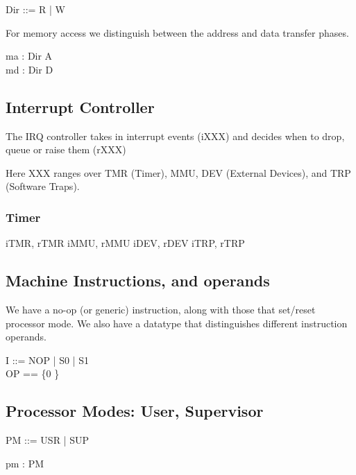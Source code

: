\begin{circus}
Dir ::= R | W
\end{circus}

For memory access we distinguish between the address and data transfer
phases.
\begin{circus}
\circchannel ma : Dir \cross A\\
\circchannel md : Dir \cross D
\end{circus}


\subsection{Interrupt Controller}

The IRQ controller takes in interrupt events (iXXX)
and decides when to drop, queue or raise them (rXXX)

Here XXX ranges over TMR (Timer),
MMU,
DEV (External Devices),
and TRP (Software Traps).
\subsubsection{Timer}

\begin{circus}
\circchannel iTMR, rTMR
\also
\circchannel iMMU, rMMU
\also
\circchannel iDEV, rDEV
\also
\circchannel iTRP, rTRP
\end{circus}

\subsection{Machine Instructions, and operands}

We have a no-op (or generic) instruction,
along with those that set/reset processor mode.
We also have a datatype that distinguishes different instruction operands.
\begin{circus}
I ::= NOP | S0 | S1
\\
OP == \{0 \}
\end{circus}

\subsection{Processor Modes: User, Supervisor}

\begin{circus}
PM ::= USR | SUP
\end{circus}

\begin{circus}
\circchannel pm : PM
\end{circus}


